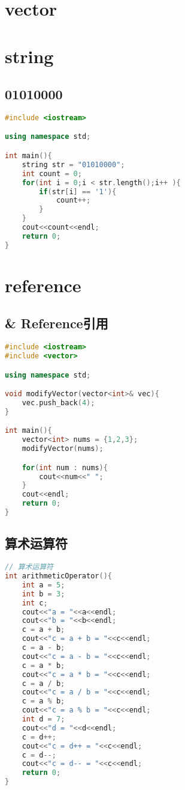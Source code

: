 \documentclass[12pt,twiside,a4paper]{ctexbook}
\numberwithin{chapter}{part}
\begin{document}
\chapter{vector}

\chapter{string}
\section{01010000}
\begin{lstlisting}[language=C++]
#include <iostream>

using namespace std;

int main(){
	string str = "01010000";
	int count = 0;
	for(int i = 0;i < str.length();i++ ){
		if(str[i] == '1'){
			count++;
		}
	}
	cout<<count<<endl;
	return 0;
}
\end{lstlisting}

\chapter{reference}
\section{\& Reference引用}
\begin{lstlisting}[language=C++]
#include <iostream>
#include <vector>

using namespace std;

void modifyVector(vector<int>& vec){
	vec.push_back(4);
}

int main(){
	vector<int> nums = {1,2,3};
	modifyVector(nums);

	for(int num : nums){
		cout<<num<<" ";
	}
	cout<<endl;
	return 0;
}
\end{lstlisting}

\section{算术运算符}
\begin{lstlisting}[language=C++]
// 算术运算符
int arithmeticOperator(){
	int a = 5;
	int b = 3;
	int c;
	cout<<"a = "<<a<<endl;
	cout<<"b = "<<b<<endl;
	c = a + b;
	cout<<"c = a + b = "<<c<<endl;
	c = a - b;
	cout<<"c = a - b = "<<c<<endl;
	c = a * b;
	cout<<"c = a * b = "<<c<<endl;
	c = a / b;
	cout<<"c = a / b = "<<c<<endl;
	c = a % b;
	cout<<"c = a % b = "<<c<<endl;
	int d = 7;
	cout<<"d = "<<d<<endl;
	c = d++;
	cout<<"c = d++ = "<<c<<endl;
	c = d--;
	cout<<"c = d-- = "<<c<<endl;
	return 0;
}
\end{lstlisting}
\end{document}
